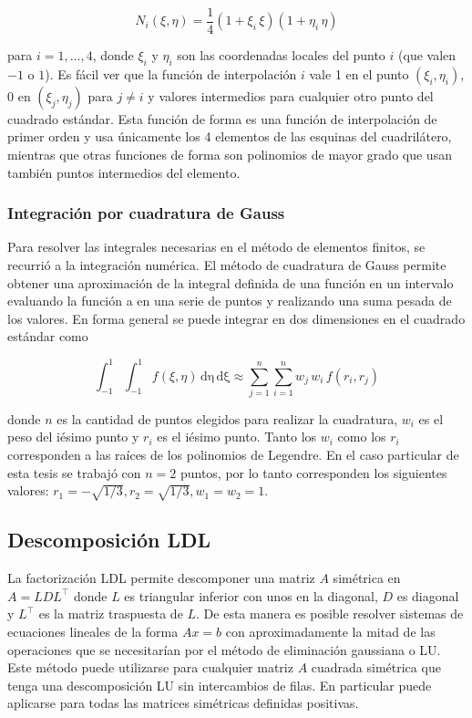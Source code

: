\begin{equation}
    N_i(\xi, \eta) = \frac{1}{4} (1 + \xi_i \, \xi) (1 + \eta_i \, \eta)
\end{equation}

para $i = 1, \ldots, 4$, donde $\xi_i$ y $\eta_i$ son las coordenadas locales del punto $i$ (que valen $-1$ o $1$).  Es fácil ver que la función de interpolación $i$ vale 1 en el punto $(\xi_i, \eta_i)$, 0 en $(\xi_j, \eta_j)$ para $j \neq i$ y valores intermedios para cualquier otro punto del cuadrado estándar. Esta función de forma es una función de interpolación de primer orden y usa únicamente los 4 elementos de las esquinas del cuadrilátero, mientras que otras funciones de forma son polinomios de mayor grado que usan también puntos intermedios del elemento.

\subsubsection*{Integración por cuadratura de Gauss}

Para resolver las integrales necesarias en el método de elementos finitos, se recurrió a la integración numérica. El método de cuadratura de Gauss permite obtener una aproximación de la integral definida de una función en un intervalo evaluando la función a en una serie de puntos y realizando una suma pesada de los valores. En forma general se puede integrar en dos dimensiones en el cuadrado estándar como

\begin{equation}
    \int_{-1}^1 \int_{-1}^{1} f(\xi, \eta) \, \mathrm{d\eta} \, \mathrm{d\xi} \approx \sum_{j=1}^{n} \sum_{i=1}^{n} w_j \, w_i \, f(r_i, r_j)
\end{equation}

donde $n$ es la cantidad de puntos elegidos para realizar la cuadratura, $w_i$ es el peso del iésimo punto y $r_i$ es el iésimo punto. Tanto los $w_i$ como los $r_i$ corresponden a las raíces de los polinomios de Legendre. En el caso particular de esta tesis se trabajó con $n = 2$ puntos, por lo tanto corresponden los siguientes valores: $r_1 = -\sqrt{1/3}, r_2 = \sqrt{1/3}, w_1 = w_2 = 1$.


\subsection*{Descomposición LDL}
La factorización LDL permite descomponer una matriz $A$ simétrica en $A = L D L^\intercal$ donde $L$ es triangular inferior con unos en la diagonal, $D$ es diagonal y $L^\intercal$ es la matriz traspuesta de $L$. De esta manera es posible resolver sistemas de ecuaciones lineales de la forma $Ax = b$ con aproximadamente la mitad de las operaciones que se necesitarían por el método de eliminación gaussiana o LU. Este método puede utilizarse para cualquier matriz $A$ cuadrada simétrica que tenga una descomposición LU sin intercambios de filas. En particular puede aplicarse para todas las matrices simétricas definidas positivas.\\

